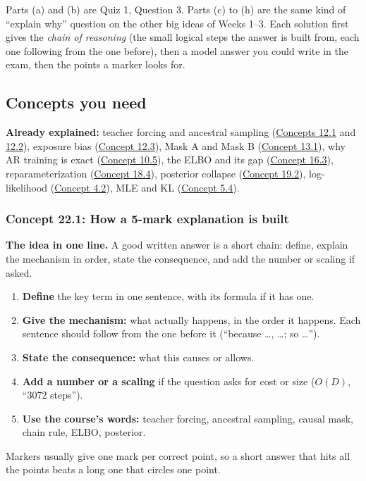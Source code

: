 \documentclass[12pt,a4paper]{article}
\begin{document}
Parts (a) and (b) are Quiz 1, Question 3. Parts (c) to (h) are the same kind of ``explain why'' question on the other big ideas of Weeks 1--3. Each solution first gives the \emph{chain of reasoning} (the small logical steps the answer is built from, each one following from the one before), then a model answer you could write in the exam, then the points a marker looks for.

\subsection{Concepts you need}

\textbf{Already explained:} teacher forcing and ancestral sampling (\hyperref[c12-1]{Concepts 12.1} and \hyperref[c12-2]{12.2}), exposure bias (\hyperref[c12-3]{Concept 12.3}), Mask A and Mask B (\hyperref[c13-1]{Concept 13.1}), why AR training is exact (\hyperref[c10-5]{Concept 10.5}), the ELBO and its gap (\hyperref[c16-3]{Concept 16.3}), reparameterization (\hyperref[c18-4]{Concept 18.4}), posterior collapse (\hyperref[c19-2]{Concept 19.2}), log-likelihood (\hyperref[c4-2]{Concept 4.2}), MLE and KL (\hyperref[c5-4]{Concept 5.4}).

\subsubsection{Concept 22.1: How a 5-mark explanation is built}\label{c22-1}

\textbf{The idea in one line.} A good written answer is a short chain: define, explain the mechanism in order, state the consequence, and add the number or scaling if asked.
\begin{enumerate}[nosep]
  \item \textbf{Define} the key term in one sentence, with its formula if it has one.
  \item \textbf{Give the mechanism:} what actually happens, in the order it happens. Each sentence should follow from the one before it (``because \dots, \dots; so \dots'').
  \item \textbf{State the consequence:} what this causes or allows.
  \item \textbf{Add a number or a scaling} if the question asks for cost or size ($O(D)$, ``3072 steps'').
  \item \textbf{Use the course's words:} teacher forcing, ancestral sampling, causal mask, chain rule, ELBO, posterior.
\end{enumerate}
Markers usually give one mark per correct point, so a short answer that hits all the points beats a long one that circles one point.
\end{document}

